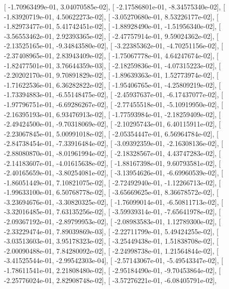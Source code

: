 \documentclass{article}
\begin{document}
       [ -1.70963499e-01,   3.04070585e-02],
       [ -2.17586801e-01,  -8.34575340e-02],
       [ -1.83920719e-01,   4.50622273e-02],
       [ -3.05270680e-01,   8.53226177e-02],
       [ -1.82973477e-01,   5.41742451e-02],
       [ -1.88928490e-01,  -1.51956340e-02],
       [ -3.56553462e-01,   2.92393365e-02],
       [ -2.47757914e-01,   9.59024362e-02],
       [ -2.13525165e-01,  -9.34843580e-02],
       [ -3.22385362e-01,  -4.70251156e-02],
       [ -2.37408965e-01,   2.83943409e-02],
       [ -1.75067778e-01,   4.64247674e-02],
       [ -1.82477501e-01,   3.76644359e-03],
       [ -2.18259836e-01,  -4.07315223e-02],
       [ -2.20202170e-01,   9.70891829e-02],
       [ -1.89639363e-01,   1.52773974e-02],
       [ -1.71622536e-01,   6.36282822e-02],
       [ -1.95406765e-01,  -4.25809219e-02],
       [ -1.73394883e-01,  -6.55148475e-02],
       [ -2.45937637e-01,  -6.17437077e-02],
       [ -1.97796751e-01,  -6.69286267e-02],
       [ -2.77455518e-01,  -5.10919950e-02],
       [ -2.16395193e-01,   6.93476913e-02],
       [ -1.77593984e-01,  -2.18259409e-02],
       [ -2.49424500e-01,  -9.70318069e-02],
       [ -2.10295743e-01,   6.40115911e-02],
       [ -2.23067845e-01,   5.00991018e-02],
       [ -2.05354447e-01,   6.56964784e-02],
       [ -2.84738454e-01,  -7.33916484e-02],
       [ -3.09392359e-01,  -2.16308136e-02],
       [ -2.88080870e-01,  -8.01961994e-02],
       [ -2.18328567e-01,   4.43747283e-02],
       [ -2.14183607e-01,  -4.01615638e-02],
       [ -1.88167398e-01,   9.60793581e-02],
       [ -2.40165659e-01,  -3.80254081e-02],
       [ -3.13954626e-01,  -6.69960539e-02],
       [ -1.86051449e-01,   7.10821075e-02],
       [ -2.72492940e-01,  -1.12266713e-02],
       [ -1.99633100e-01,   6.50768778e-02],
       [ -3.65669625e-01,   8.36678572e-02],
       [ -3.23694676e-01,  -3.30820325e-02],
       [ -1.76099014e-01,  -6.50811713e-02],
       [ -3.32016485e-01,   7.63135256e-02],
       [ -3.59939314e-01,  -7.65641978e-02],
       [ -2.09367192e-01,  -2.89799953e-02],
       [ -2.08983583e-01,   1.12789300e-02],
       [ -2.33229474e-01,   7.89039869e-03],
       [ -2.22711799e-01,   5.49424255e-02],
       [ -3.03513603e-01,   3.95178323e-02],
       [ -3.25449438e-01,   1.51838708e-02],
       [ -2.00090488e-01,   7.84280092e-02],
       [ -2.24998738e-01,   1.21564844e-02],
       [ -3.41525544e-01,  -2.99542303e-04],
       [ -2.57143067e-01,  -5.49543347e-02],
       [ -1.78611541e-01,   2.21808480e-02],
       [ -2.95184490e-01,  -9.70453864e-02],
       [ -2.25776024e-01,   2.82908748e-02],
       [ -3.57276221e-01,  -6.08405791e-02],
\end{document}
